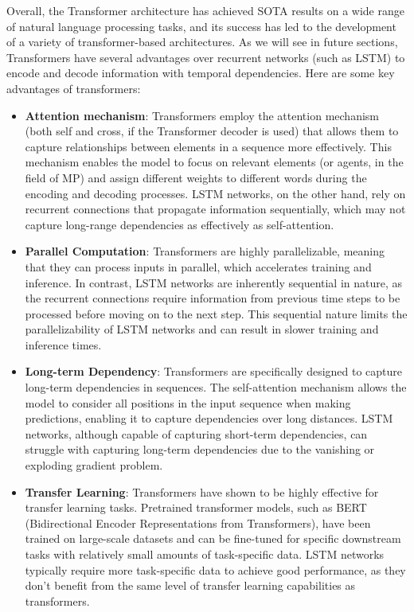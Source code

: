 Overall, the Transformer architecture has achieved \ac{SOTA} results on a wide range of natural language processing tasks, and its success has led to the development of a variety of transformer-based architectures. As we will see in future sections, Transformers have several advantages over recurrent networks (such as \ac{LSTM}) to encode and decode information with temporal dependencies. Here are some key advantages of transformers:

\begin{itemize}
	\item \textbf{Attention mechanism}: Transformers employ the attention mechanism (both self and cross, if the Transformer decoder is used) that allows them to capture relationships between elements in a sequence more effectively. This mechanism enables the model to focus on relevant elements (or agents, in the field of \ac{MP}) and assign different weights to different words during the encoding and decoding processes. \ac{LSTM} networks, on the other hand, rely on recurrent connections that propagate information sequentially, which may not capture long-range dependencies as effectively as self-attention.
	
	\item \textbf{Parallel Computation}: Transformers are highly parallelizable, meaning that they can process inputs in parallel, which accelerates training and inference. In contrast, \ac{LSTM} networks are inherently sequential in nature, as the recurrent connections require information from previous time steps to be processed before moving on to the next step. This sequential nature limits the parallelizability of \ac{LSTM} networks and can result in slower training and inference times.
	
	\item \textbf{Long-term Dependency}: Transformers are specifically designed to capture long-term dependencies in sequences. The self-attention mechanism allows the model to consider all positions in the input sequence when making predictions, enabling it to capture dependencies over long distances. \ac{LSTM} networks, although capable of capturing short-term dependencies, can struggle with capturing long-term dependencies due to the vanishing or exploding gradient problem.
	
	\item \textbf{Transfer Learning}: Transformers have shown to be highly effective for transfer learning tasks. Pretrained transformer models, such as BERT (Bidirectional Encoder Representations from Transformers), have been trained on large-scale datasets and can be fine-tuned for specific downstream tasks with relatively small amounts of task-specific data. \ac{LSTM} networks typically require more task-specific data to achieve good performance, as they don't benefit from the same level of transfer learning capabilities as transformers.
	

\end{itemize}
